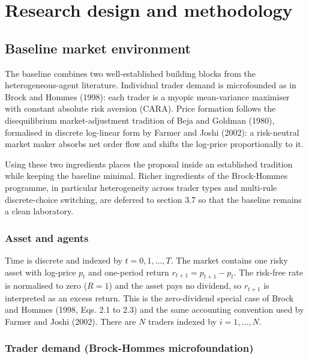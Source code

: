\documentclass[11pt]{article}
\begin{document}
\section{Research design and methodology}

\subsection{Baseline market environment}

The baseline combines two well-established building blocks from the heterogeneous-agent literature. Individual trader demand is microfounded as in Brock and Hommes (1998): each trader is a myopic mean-variance maximiser with constant absolute risk aversion (CARA). Price formation follows the disequilibrium market-adjustment tradition of Beja and Goldman (1980), formalised in discrete log-linear form by Farmer and Joshi (2002): a risk-neutral market maker absorbs net order flow and shifts the log-price proportionally to it.

Using these two ingredients places the proposal inside an established tradition while keeping the baseline minimal. Richer ingredients of the Brock-Hommes programme, in particular heterogeneity across trader types and multi-rule discrete-choice switching, are deferred to section 3.7 so that the baseline remains a clean laboratory.

\subsubsection{Asset and agents}

Time is discrete and indexed by $t = 0, 1, \ldots, T$. The market contains one risky asset with log-price $p_t$ and one-period return $r_{t+1} = p_{t+1} - p_t$. The risk-free rate is normalised to zero ($R = 1$) and the asset pays no dividend, so $r_{t+1}$ is interpreted as an excess return. This is the zero-dividend special case of Brock and Hommes (1998, Eqs. 2.1 to 2.3) and the same accounting convention used by Farmer and Joshi (2002). There are $N$ traders indexed by $i = 1, \ldots, N$.

\subsubsection{Trader demand (Brock-Hommes microfoundation)}
\end{document}
